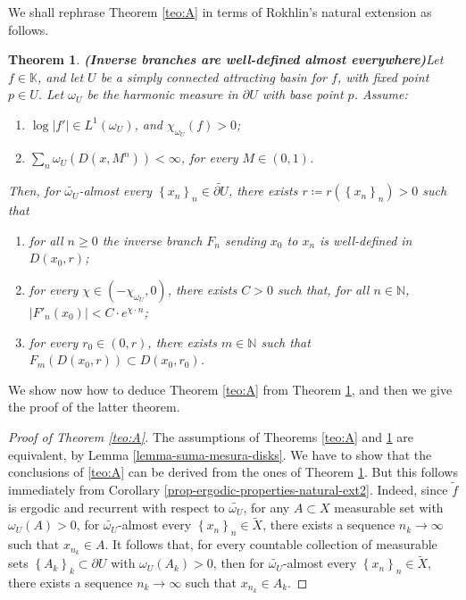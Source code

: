 \documentclass[11pt]{article}
\newtheorem{thm}{Theorem}[section]
\theoremstyle{definition}
\theoremstyle{remark}
\theoremstyle{plain}
\begin{document}
We shall rephrase Theorem \ref{teo:A} in terms of Rokhlin's natural extension as follows.
\begin{thm}{\bf (Inverse branches are well-defined almost everywhere)}\label{thm-pesin}
	Let $ f\in \mathbb{K}$, and let $U$ be a simply connected attracting basin for $ f $, with  fixed point $ p\in U $. Let $ \omega_U $ be the harmonic measure in $ \partial U $ with base point $ p $. Assume:
	\begin{enumerate}[label={\em (\alph*)}]
		\item\label{thm-pesin-hyp-lyap} $ \log \left| f'\right| \in L^1(\omega_U) $, and $ \chi_{\omega_U}(f)>0$;
		\item \label{thm-pesin-hyp-SV}  $\sum_n \omega_U (D(x,M^n ))<\infty $, for every $ M\in (0,1) $.
	\end{enumerate}
	Then, for $ \widetilde{\omega_U} $-almost every $ \left\lbrace x_n\right\rbrace _n \in \widetilde{\partial U}$, there exists $ r\coloneqq r(\left\lbrace x_n\right\rbrace _n)>0 $ such that
		\begin{enumerate}[label={\em (\roman*)}]
		\item for all $n\geq 0$ the inverse branch $ F_n $ sending $x_0 $ to $ x_n $ is well-defined in $ D(x_0,r) $;
		\item  for every $ \chi\in (-\chi_{\omega_U}, 0) $, there exists $ C>0 $ such that, for all $ n\in\mathbb{N}$,  $ \left| F'_n(x_0)\right|<C \cdot e^{\chi \cdot n} $;
		\item  for every $ r_0\in (0, r)$, there exists $ m\in\mathbb{N} $ such that $ F_m(D(x_0, r))\subset D(x_0, r_0) $. 
	\end{enumerate}
\end{thm}

We show now how to deduce Theorem \ref{teo:A} from Theorem \ref{thm-pesin}, and then we give the proof of the latter theorem. 

\begin{proof}[Proof of Theorem \ref{teo:A}] The assumptions of Theorems \ref{teo:A} and \ref{thm-pesin} are equivalent, by Lemma \ref{lemma-suma-mesura-disks}. We have to show that the conclusions of \ref{teo:A} can be derived from the ones of Theorem \ref{thm-pesin}. But this follows immediately from Corollary \ref{prop-ergodic-properties-natural-ext2}. Indeed, since $ \widetilde{f} $  is ergodic and recurrent with respect to $ \widetilde{\omega_U} $,  for any  $ A\subset X $ measurable set  with $ \omega_U(A)>0 $, for $ \widetilde{\omega_U} $-almost every $ \left\lbrace x_n\right\rbrace _n\in \widetilde{X }$, there exists a sequence $ n_k\to \infty $ such that $ x_{n_k}\in A $.  It follows that, for every countable collection of measurable sets $ \left\lbrace A_k\right\rbrace _k\subset\partial U $ with $ \omega_U(A_k) >0$, then for $ \widetilde{\omega_U} $-almost every $ \left\lbrace x_n\right\rbrace _n\in \widetilde{X }$, there exists a sequence $ n_k\to \infty $ such that $ x_{n_k}\in A_k $. 
\end{proof}
\end{document}
